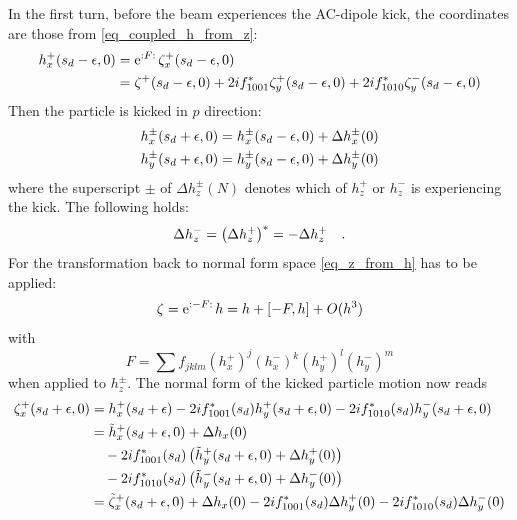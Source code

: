 In the first turn, before the beam experiences the AC-dipole kick, the coordinates are those from
\eqref{eq_coupled_h_from_z}:
%
\begin{align}
  h_x^+(s_d-\epsilon, 0) &=  \text{e}^{{:}F{:}\,} \zeta_x^+(s_d-\epsilon, 0)\notag \\
  &=  \zeta^+(s_d-\epsilon,0)
    + 2if_{1001}^*\zeta_y^+(s_d-\epsilon, 0)
    + 2if_{1010}^*\zeta_y^-(s_d-\epsilon,0)
\end{align}
%
Then the particle is kicked in $p$ direction:
%
\begin{align}
  h_x^\pm(s_d+\epsilon, 0) =  h_x^\pm(s_d - \epsilon,0) + \Delta h_x^\pm(0)\notag \\
  h_y^\pm(s_d+\epsilon, 0) =  h_y^\pm(s_d - \epsilon,0) + \Delta h_y^\pm(0)
\end{align}
%
where the superscript $\pm$ of $\Delta h_z^\pm(N)$ denotes which of $h_z^+$ or $h_z^-$ is experiencing
the kick. The following holds:
%
\begin{equation}
    \Delta h_z^- = \left(\Delta h_z^+\right)^* = -\Delta h_z^+
    \quad .
\end{equation}
%
For the transformation back to normal form space \eqref{eq_z_from_h} has to be applied:
%
\begin{equation}
  \zeta = \text{e}^{{:}-F{:}\,} h = h + [-F,h] + O(h^3)
  \label{eq_coupled_h_after_kick}
\end{equation}
%
with
%
\begin{equation}
  F = \sum f_{jklm}\left( h_x^+ \right)^j \left( h_x^- \right)^k \left( h_y^+ \right)^l \left( h_y^- \right)^m
\end{equation}
%
when applied to $h_z^\pm$.
The normal form of the kicked particle motion now reads
%
\begin{align}
    \zeta_x^+(s_d+\epsilon, 0)
        &= h_x^+(s_d+\epsilon)
            - 2if_{1001}^*(s_d) h_y^+(s_d+\epsilon, 0)
            - 2if_{1010}^*(s_d) h_y^-(s_d+\epsilon, 0)
    \notag\\
        &= \tilde{h}_x^+(s_d+\epsilon,0) + \Delta h_x(0)
            \notag \\ &\quad - 2if_{1001}^*(s_d) \left(\tilde{h}_y^+(s_d+\epsilon, 0) + \Delta h_y^+(0)\right)
            \notag \\ &\quad - 2if_{1010}^*(s_d) \left(\tilde{h}_y^-(s_d+\epsilon, 0) + \Delta h_y^-(0)\right)
    \notag \\
        &= \tilde{\zeta}_x^+(s_d+\epsilon, 0) + \Delta h_x(0)
            - 2if_{1001}^*(s_d) \Delta h_y^+(0)
            - 2if_{1010}^*(s_d) \Delta h_y^-(0)
\end{align}
